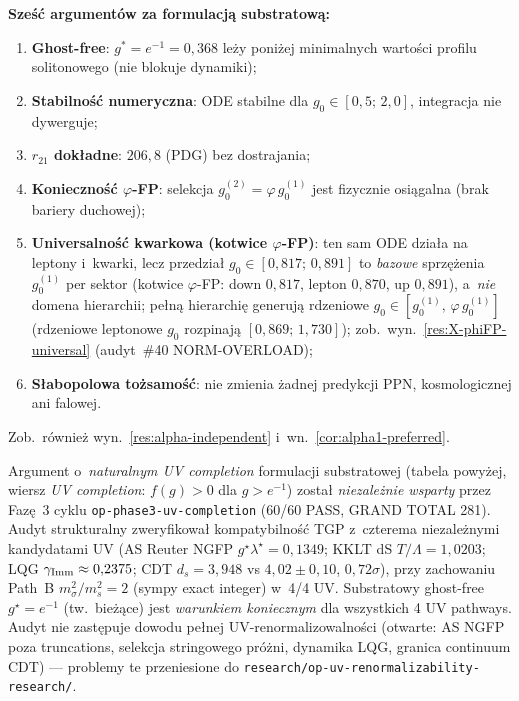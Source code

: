 \begin{remark}[S\l{}ownik formulacji: $K=g^4$ vs $K=g^2$]
\medskip\noindent
\textbf{Sze\'s\'c argument\'ow za formulacj\k{a} substratow\k{a}:}
\begin{enumerate}[nosep]
  \item \textbf{Ghost-free}: $g^* = e^{-1} = 0{,}368$ le\.zy poni\.zej
    minimalnych warto\'sci profilu solitonowego (nie blokuje dynamiki);
  \item \textbf{Stabilno\'s\'c numeryczna}: ODE stabilne dla
    $g_0 \in [0{,}5;\, 2{,}0]$, integracja nie dywerguje;
  \item \textbf{$r_{21}$ dok\l{}adne}: $206{,}8$ (PDG) bez dostrajania;
  \item \textbf{Konieczno\'s\'c $\varphi$-FP}: selekcja
    $g_0^{(2)} = \varphi\,g_0^{(1)}$ jest fizycznie
    osi\k{a}galna (brak bariery duchowej);
  \item \textbf{Universalno\'s\'c kwarkowa (kotwice $\varphi$-FP)}:
    ten sam ODE dzia\l{}a na leptony i~kwarki, lecz przedzia\l{}
    $g_0 \in [0{,}817;\, 0{,}891]$ to \emph{bazowe} sprz\k{e}\.zenia
    $g_0^{(1)}$ per sektor (kotwice $\varphi$-FP: down $0{,}817$,
    lepton $0{,}870$, up $0{,}891$), a~\emph{nie} domena hierarchii;
    pe\l{}n\k{a} hierarchi\k{e} generuj\k{a} rdzeniowe
    $g_0 \in [g_0^{(1)},\, \varphi\,g_0^{(1)}]$ (rdzeniowe leptonowe
    $g_0$ rozpinaj\k{a} $[0{,}869;\, 1{,}730]$);
    zob.~wyn.~\ref{res:X-phiFP-universal} (audyt~\#40 NORM-OVERLOAD);
  \item \textbf{S\l{}abopolowa to\.zsamo\'s\'c}: nie zmienia
    \.zadnej predykcji PPN, kosmologicznej ani falowej.
\end{enumerate}
\noindent
Zob.~r\'ownie\.z wyn.~\ref{res:alpha-independent}
i~wn.~\ref{cor:alpha1-preferred}.
\end{remark}

\begin{remark}%
\label{rem:phase3-UV-cross-corroboration}
Argument o~\emph{naturalnym UV completion} formulacji substratowej
(tabela powy\.zej, wiersz \textit{UV completion}: $f(g) > 0$ dla $g > e^{-1}$)
zosta\l{} \textsl{niezale\.znie wsparty} przez Faz\k{e}~3 cyklu
\texttt{op-phase3-uv-completion} (60/60 PASS, GRAND TOTAL 281).
Audyt strukturalny zweryfikowa\l{} kompatybilno\'s\'c TGP
z~czterema niezale\.znymi kandydatami UV
(AS Reuter NGFP $g^\star\!\lambda^\star = 0{,}1349$;
KKLT dS $T/\Lambda = 1{,}0203$;
LQG $\gamma_{\rm Imm} \approx 0{,}2375$;
CDT $d_s = 3{,}948$ vs $4{,}02 \pm 0{,}10$, $0{,}72\sigma$),
przy zachowaniu Path~B $m_\sigma^2/m_s^2 = 2$ (sympy exact integer)
w~4/4 UV. Substratowy ghost-free $g^\star = e^{-1}$
(tw.~bie\.z\k{a}ce) jest \emph{warunkiem koniecznym} dla wszystkich
4 UV pathways. Audyt nie zast\k{e}puje dowodu pe\l{}nej
UV-renormalizowalno\'sci (otwarte: AS NGFP poza truncations,
selekcja stringowego pr\'o\.zni, dynamika LQG, granica continuum CDT)
--- problemy te przeniesione do
\texttt{research/op-uv-renormalizability-research/}.
\end{remark}


